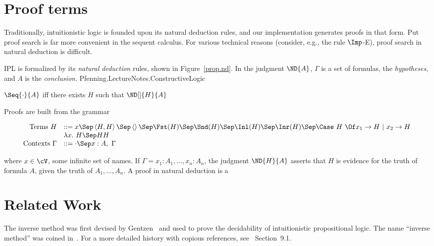 \section{Proof terms}\label{prop.sec.proofterms}

Traditionally, intuitionistic logic is founded
upon its natural deduction rules, and our implementation generates
proofs in that form.  Put proof search is far more convenient
in the sequent calculus.
For various technical reasons (consider, e.g., the rule $\Imp$-E), proof search
in natural deduction is difficult.

IPL is formalized by its \emph{natural deduction} rules,
shown in Figure~\ref{prop.nd}.  In the judgment $\ND{A}$,
$\Gamma$ is a set of formulas, the \emph{hypotheses}, and $A$ is
the \emph{conclusion}.  Pfenning.LectureNotes.ConstructiveLogic



\begin{theorem}
  $\Seq{\cdot}{A}$ iff there exists $H$ such that $\ND[]{H}{A}$
\end{theorem}



\noindent Proofs are built from the grammar

\[
\begin{array}{rl}
\mbox{Terms } H &::= x \Sep \left<H, H\right> \Sep \left<\right> \Sep \Fst(H) \Sep \Snd(H) \Sep \Inl(H) \Sep \Inr(H) \Sep \Case\ H\ \Of x_1 \to H\ |\ x_2 \to H\\
                & \lambda x.\ H \Sep H H \\
\mbox{Contexts } \Gamma &::= \cdot \Sep x : A,\ \Gamma
\end{array}
\]

where $x\in\cV$, some infinite set of names.   If $\Gamma=x_1 : A_1, \ldots, x_n : A_n$,
the judgment $\ND{H}{A}$ asserts that $H$ is evidence for the truth of formula $A$, given
the truth of $A_1,\ldots,A_n$.  A proof in natural deduction is a


\section{Related Work}\label{prop.sec.related}

The inverse method was first devised by Gentzen~\cite{Gentzen.1934.MZ}
and used to prove the decidability of intuitionistic propositional
logic.  The name ``inverse method'' was coined
in~\cite{Maslov.1964.Inverse}.  For a more detailed history with
copious references, see~\cite{Voronkov.2001.Handbook} Section~9.1.


